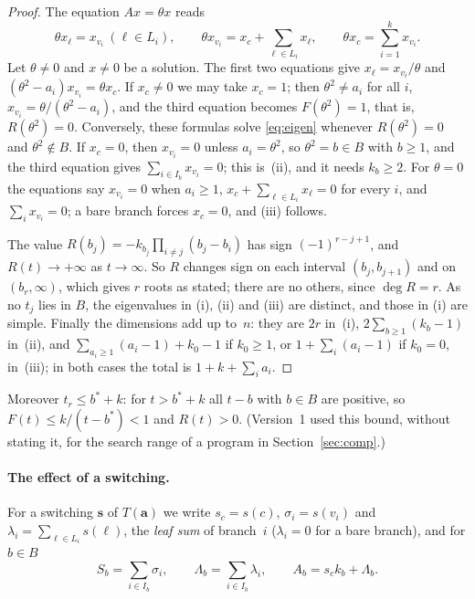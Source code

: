 \documentclass[11pt]{article}
\numberwithin{equation}{section}
\theoremstyle{remark}
\newcommand{\s}{\mathbf s}
\newcommand{\bfa}{\mathbf a}
\begin{document}
\begin{proof}
The equation $Ax=\theta x$ reads
\begin{equation}\label{eq:eigen}
 \theta x_\ell=x_{v_i}\ (\ell\in L_i),\qquad
 \theta x_{v_i}=x_c+\sum_{\ell\in L_i}x_\ell,\qquad
 \theta x_c=\sum_{i=1}^kx_{v_i}.
\end{equation}
Let $\theta\ne0$ and $x\ne0$ be a solution. The first two equations give
$x_\ell=x_{v_i}/\theta$ and $(\theta^2-a_i)x_{v_i}=\theta x_c$. If $x_c\ne0$ we
may take $x_c=1$; then $\theta^2\ne a_i$ for all $i$,
$x_{v_i}=\theta/(\theta^2-a_i)$, and the third equation becomes
$F(\theta^2)=1$, that is, $R(\theta^2)=0$. Conversely, these formulas solve
\eqref{eq:eigen} whenever $R(\theta^2)=0$ and $\theta^2\notin B$. If $x_c=0$,
then $x_{v_i}=0$ unless $a_i=\theta^2$, so $\theta^2=b\in B$ with $b\ge1$, and
the third equation gives $\sum_{i\in I_b}x_{v_i}=0$; this is~(ii), and it
needs $k_b\ge2$. For $\theta=0$ the equations say $x_{v_i}=0$ when $a_i\ge1$,
$x_c+\sum_{\ell\in L_i}x_\ell=0$ for every $i$, and $\sum_ix_{v_i}=0$; a bare
branch forces $x_c=0$, and (iii) follows.

The value $R(b_j)=-k_{b_j}\prod_{i\ne j}(b_j-b_i)$ has sign $(-1)^{r-j+1}$, and
$R(t)\to+\infty$ as $t\to\infty$. So $R$ changes sign on each interval
$(b_j,b_{j+1})$ and on $(b_r,\infty)$, which gives $r$ roots as stated; there
are no others, since $\deg R=r$. As no $t_j$ lies in $B$, the eigenvalues in
(i), (ii) and (iii) are distinct, and those in (i) are simple. Finally the
dimensions add up to~$n$: they are $2r$ in~(i), $2\sum_{b\ge1}(k_b-1)$ in~(ii),
and $\sum_{a_i\ge1}(a_i-1)+k_0-1$ if $k_0\ge1$, or $1+\sum_i(a_i-1)$ if
$k_0=0$, in~(iii); in both cases the total is $1+k+\sum_ia_i$.
\end{proof}

Moreover $t_r\le b^*+k$: for $t>b^*+k$ all $t-b$ with $b\in B$ are positive,
so $F(t)\le k/(t-b^*)<1$ and $R(t)>0$. (Version~1 used this bound, without stating it, for the search range
of a program in Section~\ref{sec:comp}.)

\paragraph{The effect of a switching.}
For a switching $\s$ of $T(\bfa)$ we write $s_c=s(c)$, $\sigma_i=s(v_i)$ and
$\lambda_i=\sum_{\ell\in L_i}s(\ell)$, the \emph{leaf sum} of branch~$i$
($\lambda_i=0$ for a bare branch), and for $b\in B$
\[
 S_b=\sum_{i\in I_b}\sigma_i,\qquad \Lambda_b=\sum_{i\in I_b}\lambda_i,\qquad
 A_b=s_ck_b+\Lambda_b .
\]
\end{document}
